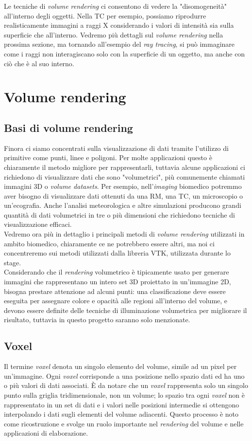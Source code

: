 Le tecniche di \emph{volume rendering} ci consentono di vedere la "disomogeneità" all'interno degli oggetti. Nella TC per esempio, possiamo riprodurre realisticamente immagini a raggi X considerando i valori di intensità sia sulla superficie che all'interno. Vedremo più dettagli sul \emph{volume rendering} nella prossima sezione, ma tornando all'esempio del \emph{ray tracing}, si può immaginare come i raggi non interagiscano solo con la superficie di un oggetto, ma anche con ciò che è al suo interno.

\section{Volume rendering}
\subsection{Basi di volume rendering}\label{sec:volume-rendering-details}
Finora ci siamo concentrati sulla visualizzazione di dati tramite l'utilizzo di primitive come punti, linee e poligoni. Per molte applicazioni questo è chiaramente il metodo migliore per rappresentarli, tuttavia alcune applicazioni ci richiedono di visualizzare dati che sono "volumetrici", più comunemente chiamati immagini 3D o \emph{volume datasets}. Per esempio, nell'\emph{imaging} biomedico potremmo aver bisogno di visualizzare dati ottenuti da una RM, una TC, un microscopio o un'ecografia. Anche l'analisi meteorologica e altre simulazioni producono grandi quantità di dati volumetrici in tre o più dimensioni che richiedono tecniche di visualizzazione efficaci.
\\
Vedremo ora più in dettaglio i principali metodi di \emph{volume rendering} utilizzati in ambito biomedico, chiaramente ce ne potrebbero essere altri, ma noi ci concentreremo sui metodi utilizzati dalla libreria VTK, utilizzata durante lo stage.
\\
Considerando che il \emph{rendering} volumetrico è tipicamente usato per generare immagini che rappresentano un intero set 3D proiettato in un'immagine 2D, bisogna prestare attenzione ad alcuni punti: una classificazione deve essere eseguita per assegnare colore e opacità alle regioni all'interno del volume, e devono essere definite delle tecniche di illuminazione volumetrica per migliorare il risultato, tuttavia in questo progetto saranno solo menzionate.

\subsection{Voxel}
Il termine \emph{voxel} denota un singolo elemento del volume, simile ad un pixel per un'immagine. Ogni \emph{voxel} corrisponde a una posizione nello spazio dati ed ha uno o più valori di dati associati. \`E da notare che un \emph{voxel} rappresenta solo un singolo punto sulla griglia tridimensionale, non un volume; lo spazio tra ogni \emph{voxel} non è rappresentato in un set di dati e i valori nelle posizioni intermedie si ottengono interpolando i dati sugli elementi del volume adiacenti. Questo processo è noto come ricostruzione e svolge un ruolo importante nel \emph{rendering} del volume e nelle applicazioni di elaborazione.

